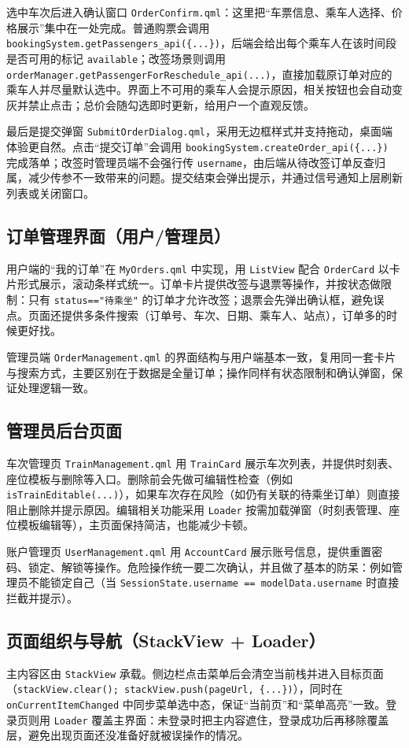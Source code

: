 \documentclass{article}
\begin{document}
	选中车次后进入确认窗口 \texttt{OrderConfirm.qml}：这里把“车票信息、乘车人选择、价格展示”集中在一处完成。普通购票会调用 \texttt{bookingSystem.getPassengers\_api(\{...\})}，后端会给出每个乘车人在该时间段是否可用的标记 \texttt{available}；改签场景则调用 \texttt{orderManager.getPassengerForReschedule\_api(...)}，直接加载原订单对应的乘车人并尽量默认选中。界面上不可用的乘车人会提示原因，相关按钮也会自动变灰并禁止点击；总价会随勾选即时更新，给用户一个直观反馈。
	
	最后是提交弹窗 \texttt{SubmitOrderDialog.qml}，采用无边框样式并支持拖动，桌面端体验更自然。点击“提交订单”会调用 \texttt{bookingSystem.createOrder\_api(\{...\})} 完成落单；改签时管理员端不会强行传 \texttt{username}，由后端从待改签订单反查归属，减少传参不一致带来的问题。提交结束会弹出提示，并通过信号通知上层刷新列表或关闭窗口。
	
	\subsection{订单管理界面（用户/管理员）}
	用户端的“我的订单”在 \texttt{MyOrders.qml} 中实现，用 \texttt{ListView} 配合 \texttt{OrderCard} 以卡片形式展示，滚动条样式统一。订单卡片提供改签与退票等操作，并按状态做限制：只有 \texttt{status=="待乘坐"} 的订单才允许改签；退票会先弹出确认框，避免误点。页面还提供多条件搜索（订单号、车次、日期、乘车人、站点），订单多的时候更好找。
	
	管理员端 \texttt{OrderManagement.qml} 的界面结构与用户端基本一致，复用同一套卡片与搜索方式，主要区别在于数据是全量订单；操作同样有状态限制和确认弹窗，保证处理逻辑一致。
	
	\subsection{管理员后台页面}
	车次管理页 \texttt{TrainManagement.qml} 用 \texttt{TrainCard} 展示车次列表，并提供时刻表、座位模板与删除等入口。删除前会先做可编辑性检查（例如 \texttt{isTrainEditable(...)}），如果车次存在风险（如仍有关联的待乘坐订单）则直接阻止删除并提示原因。编辑相关功能采用 \texttt{Loader} 按需加载弹窗（时刻表管理、座位模板编辑等），主页面保持简洁，也能减少卡顿。
	
	账户管理页 \texttt{UserManagement.qml} 用 \texttt{AccountCard} 展示账号信息，提供重置密码、锁定、解锁等操作。危险操作统一要二次确认，并且做了基本的防呆：例如管理员不能锁定自己（当 \texttt{SessionState.username == modelData.username} 时直接拦截并提示）。
	
	\subsection{页面组织与导航（StackView + Loader）}
	主内容区由 \texttt{StackView} 承载。侧边栏点击菜单后会清空当前栈并进入目标页面（\texttt{stackView.clear(); stackView.push(pageUrl, \{...\})}），同时在 \texttt{onCurrentItemChanged} 中同步菜单选中态，保证“当前页”和“菜单高亮”一致。登录页则用 \texttt{Loader} 覆盖主界面：未登录时把主内容遮住，登录成功后再移除覆盖层，避免出现页面还没准备好就被误操作的情况。
	
\end{document}
